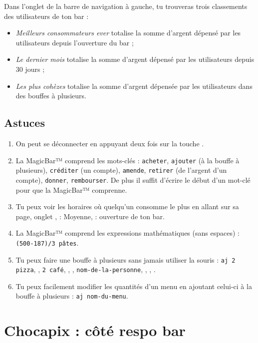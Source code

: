 \documentclass[12pt,french]{article}
\begin{document}
Dans l'onglet  de la barre de navigation à gauche, tu trouveras trois classements des utilisateurs de ton bar :
\begin{itemize}
	\item \emph{Meilleurs consommateurs ever} totalise la somme d'argent dépensé par les utilisateurs depuis l'ouverture du bar ;
	\item \emph{Le dernier mois} totalise la somme d'argent dépensé par les utilisateurs depuis 30 jours ;
	\item \emph{Les plus cohèzes} totalise la somme d'argent dépensée par les utilisateurs dans des bouffes à plusieurs.
\end{itemize}

\subsection{Astuces}

\begin{enumerate}
	\item On peut se déconnecter en appuyant deux fois sur la touche .
	\item La MagicBar™ comprend les mots-clés : \texttt{acheter}, \texttt{ajouter} (à la bouffe à plusieurs), \texttt{créditer} (un compte), \texttt{amende}, \texttt{retirer} (de l'argent d'un compte), \texttt{donner}, \texttt{rembourser}. De plus il suffit d'écrire le début d'un mot-clé pour que la MagicBar™ comprenne.
	\item Tu peux voir les horaires où quelqu'un consomme le plus en allant sur sa page, onglet ,  : Moyenne,  : ouverture de ton bar.
	\item La MagicBar™ comprend les expressions mathématiques (sans espaces) : \texttt{(500-187)/3 pâtes}.
	\item Tu peux faire une bouffe à plusieurs sans jamais utiliser la souris : \texttt{aj 2 pizza}, , \texttt{2 café}, , , \texttt{nom-de-la-personne}, , , .
	\item Tu peux facilement modifier les quantités d'un menu en ajoutant celui-ci à la bouffe à plusieurs : \texttt{aj nom-du-menu}.
\end{enumerate}



\section{Chocapix : côté respo bar}
\end{document}
